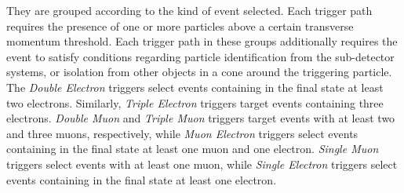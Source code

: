 They are grouped according to the kind of event selected.
Each trigger path requires the presence of one or more particles above a certain transverse momentum threshold.
Each trigger path in these groups additionally requires the event to satisfy conditions regarding particle identification from the sub-detector systems,
or isolation from other objects in a cone around the triggering particle.
The \textit{Double Electron} triggers select events containing in the final state at least two electrons.
Similarly, \textit{Triple Electron} triggers target events containing three electrons.
\textit{Double Muon} and \textit{Triple Muon} triggers target events with at least two and three muons, respectively,
while \textit{Muon Electron} triggers select events containing in the final state at least one muon and one electron.
\textit{Single Muon} triggers select events with at least one muon,
while \textit{Single Electron} triggers select events containing in the final state at least one electron.
